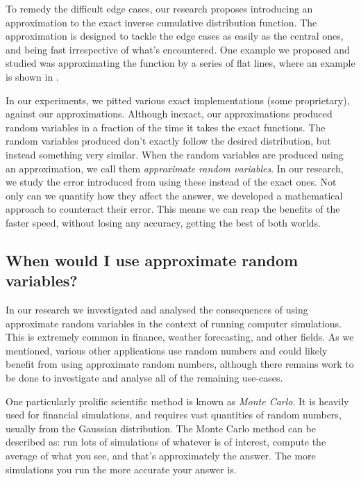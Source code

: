 \documentclass[11pt,a4paper,twoside,english]{extarticle}
\begin{document}
To remedy the difficult edge cases, our research proposes introducing an approximation to the exact inverse cumulative distribution function. The approximation is designed to tackle the edge cases as easily as the central ones, and being fast irrespective of what's encountered. One example we proposed and studied was approximating the function by a series of flat lines, where an example is shown in . 

In our experiments, we pitted various exact implementations (some proprietary), against our approximations. Although inexact, our approximations produced random variables in a fraction of the time it takes the exact functions. The random variables produced don't exactly follow the desired distribution, but instead something very similar. When the random variables are produced  using an approximation, we call them \emph{approximate random variables}. In our research, we study the error introduced from using these instead of the exact ones. Not only can we quantify how they affect the answer, we developed a mathematical approach to counteract their error. This means we can reap the benefits of the faster speed, without losing any accuracy, getting the best of both worlds. 

\subsection{When would I use approximate random variables?}
\label{sec:when_would_i_use_approximate_random_variables}

In our research we investigated and analysed the consequences of using approximate random variables in the context of running computer simulations. This is extremely common in finance, weather forecasting, and other fields. As we mentioned, various other applications use random numbers and could likely benefit from using approximate random numbers, although there remains work to be done to investigate and analyse all of the remaining use-cases.

One particularly prolific scientific method is known as \emph{Monte Carlo}. It is heavily used for financial simulations, and requires vast quantities of random numbers, usually from the Gaussian distribution. The Monte Carlo method can be described as: run lots of simulations of whatever is of interest, compute the average of what you see, and that's approximately the answer. The more simulations you run the more accurate your answer is. 
\end{document}
